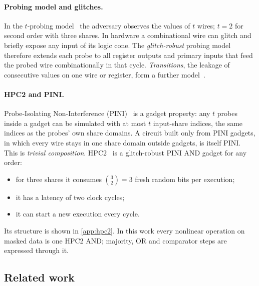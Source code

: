 \paragraph{Probing model and glitches.} In the $t$-probing model~\cite{ishai2003} the adversary observes the values of $t$ wires; $t = 2$ for second order with three shares. In hardware a combinational wire can glitch and briefly expose any input of its logic cone. The \emph{glitch-robust} probing model~\cite{faust2018} therefore extends each probe to all register outputs and primary inputs that feed the probed wire combinationally in that cycle. \emph{Transitions}, the leakage of consecutive values on one wire or register, form a further model~\cite{cassiers2021trans}.

\paragraph{HPC2 and PINI.} Probe-Isolating Non-Interference (PINI)~\cite{cassiers2020pini} is a gadget property: any $t$ probes inside a gadget can be simulated with at most $t$ input-share indices, the same indices as the probes' own share domains. A circuit built only from PINI gadgets, in which every wire stays in one share domain outside gadgets, is itself PINI. This is \emph{trivial composition}. HPC2~\cite{cassiers2021hpc} is a glitch-robust PINI AND gadget for any order:
\begin{itemize}
  \item for three shares it consumes $\binom{3}{2} = 3$ fresh random bits per execution;
  \item it has a latency of two clock cycles;
  \item it can start a new execution every cycle.
\end{itemize}

Its structure is shown in \cref{app:hpc2}. In this work every nonlinear operation on masked data is one HPC2 AND; majority, OR and comparator steps are expressed through it.

\subsection{Related work}\label{sec:related}
